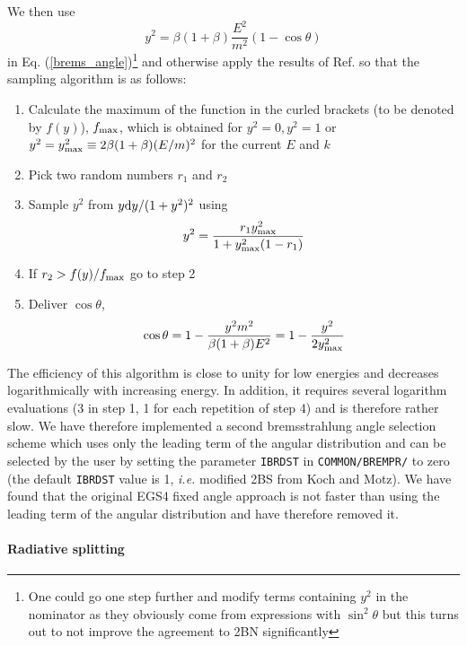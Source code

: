 We then use
\begin{equation}
y^2 = \beta (1 + \beta) \frac{E^2}{m^2} (1 - \cos \theta)
\end{equation}
in Eq. (\ref{brems_angle})\footnote{One could go one step
further and modify terms containing $y^2$ in the nominator
as they obviously come from expressions with $\sin^2 \theta$ but
this turns out to not improve the agreement to 2BN significantly}
and otherwise apply the results of
Ref. \cite{Bi89} so that the sampling algorithm is as follows:
\begin{enumerate}
\item
Calculate the maximum of the function in the curled brackets (to be
denoted by $f(y)$),
$f_{\rm max}$,
which is obtained for $y^2 = 0, y^2 = 1$ or $y^2 = y_{\rm max}^2 \equiv
2 \beta (1 + \beta) (E/m)^2$ for the current $E$ and $k$
\item
Pick two random numbers $r_1$ and $r_2$
\item
Sample $y^2$ from $y {\rm d}y/(1+y^2)^2$ using
\begin{equation}
y^2 = {r_1 y_{\rm max}^2 \over 1 + y_{\rm max}^2 (1 - r_1)}
\end{equation}
\item
If $r_2 > f(y)/f_{\rm max}$ go to step 2
\item
Deliver $\cos \theta$,
\begin{equation}
\cos \theta = 1 - {y^2 m^2 \over \beta (1 + \beta) E^2}
= 1 - \frac{y^2}{2 y_{\rm max}^2}
\end{equation}
\end{enumerate}
The efficiency of this algorithm is close to unity for low
energies and decreases logarithmically with increasing energy.
In addition, it requires several logarithm evaluations
(3 in step 1, 1 for each repetition of step 4) and is therefore
rather slow. We have therefore implemented a second bremsstrahlung
angle selection scheme which uses only the leading term of
the angular distribution and can be selected by the user
by setting the parameter {\tt IBRDST} in {\tt COMMON/BREMPR/} to zero
(the default {\tt IBRDST} value is 1,
{\em i.e.} modified 2BS from Koch and Motz).
We have found that the original
EGS4 fixed angle approach is not faster than using the
leading term of the angular distribution and have
therefore removed it.

\paragraph{Radiative splitting} \hfill
\label{rad_split}

